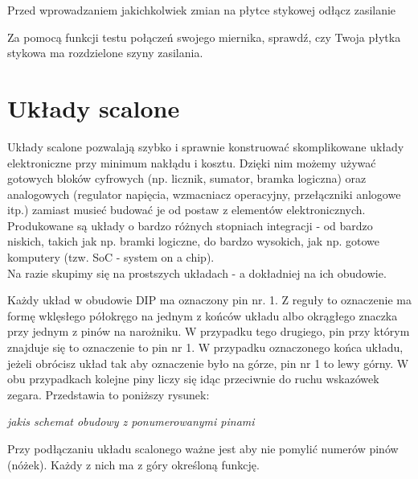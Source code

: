 \documentclass{pdfBooklets}
\begin{document}
\begin{ProTip}{}
  Przed wprowadzaniem jakichkolwiek zmian na płytce stykowej odłącz zasilanie
\end{ProTip}

\begin{Zadanie}{}{}
Za pomocą funkcji testu połączeń swojego miernika, sprawdź, czy Twoja płytka stykowa ma rozdzielone szyny zasilania.
\end{Zadanie}



\section{Układy scalone}
Układy scalone pozwalają szybko i sprawnie konstruować skomplikowane układy elektroniczne przy minimum nakłądu i kosztu. Dzięki nim możemy
używać gotowych bloków cyfrowych (np. licznik, sumator, bramka logiczna) oraz analogowych (regulator napięcia, wzmacniacz operacyjny,
przełączniki anlogowe itp.) zamiast musieć budować je od postaw z elementów elektronicznych. Produkowane są układy o bardzo różnych stopniach
integracji - od bardzo niskich, takich jak np. bramki logiczne, do bardzo wysokich, jak np. gotowe komputery (tzw. SoC - system on a chip).
\\

Na razie skupimy się na prostszych układach - a dokładniej na ich obudowie.

Każdy układ w obudowie DIP ma oznaczony pin nr. 1. Z reguły to oznaczenie ma formę wklęsłego półokręgo na jednym z końców układu albo
okrągłego znaczka przy jednym z pinów na narożniku. W przypadku tego drugiego, pin przy którym znajduje się to oznaczenie to pin nr 1.
W przypadku oznaczonego końca układu, jeżeli obrócisz układ tak aby oznaczenie było na górze, pin nr 1 to lewy górny. W obu przypadkach kolejne piny
liczy się idąc przeciwnie do ruchu wskazówek zegara. Przedstawia to poniższy rysunek:

\textit{jakis schemat obudowy z ponumerowanymi pinami}

Przy podłączaniu układu scalonego ważne jest aby nie pomylić numerów pinów (nóżek). Każdy z nich ma z góry określoną funkcję.
\end{document}
